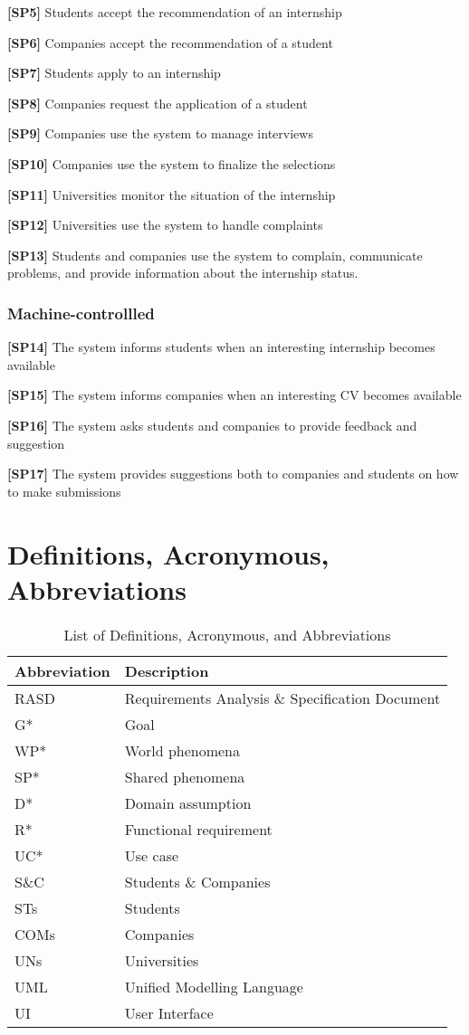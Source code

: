 \textbf{[SP5]} Students accept the recommendation of an internship

\textbf{[SP6]} Companies accept the recommendation of a student

\textbf{[SP7]} Students apply to an internship

\textbf{[SP8]} Companies request the application of a student

\textbf{[SP9]} Companies use the system to manage interviews

\textbf{[SP10]} Companies use the system to finalize the selections

\textbf{[SP11]} Universities monitor the situation of the internship

\textbf{[SP12]} Universities use the system to handle complaints

\textbf{[SP13] }Students and companies use the system to complain, communicate problems, and provide information about the internship status.

\subsubsection{Machine-controllled}
\textbf{[SP14]} The system informs students when an interesting internship becomes available

\textbf{[SP15]} The system informs companies when an interesting CV becomes available

\textbf{[SP16]} The system asks students and companies to provide feedback and suggestion

\textbf{[SP17]} The system provides suggestions both to companies and students on how to make submissions

\pagebreak
\section{Definitions, Acronymous, Abbreviations}
\begin{table}[H]
\centering
\begin{tabular}{|l|l|}
\hline
\textbf{Abbreviation} & \textbf{Description} \\ \hline
RASD & Requirements Analysis \& Specification Document \\ \hline
G* & Goal \\ \hline
WP* & World phenomena \\ \hline
SP* & Shared phenomena \\ \hline
D* & Domain assumption \\ \hline
R* & Functional requirement \\ \hline
UC* & Use case \\ \hline
S\&C & Students \& Companies \\ \hline
STs & Students \\ \hline
COMs & Companies \\ \hline
UNs & Universities \\ \hline
UML & Unified Modelling Language \\ \hline
UI & User Interface \\ \hline
\end{tabular}
\caption{List of Definitions, Acronymous, and Abbreviations}
\label{table:abbreviations}
\end{table}


